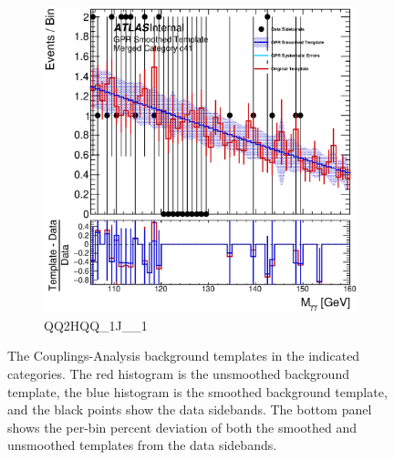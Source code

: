 \begin{figure}
\begin{center}
\begin{subfigure}[T]{0.49\linewidth}
	\includegraphics[width=\linewidth]{figures/background/gpr/coupCatTemplates/GPR_Smoothed_Plot_hmgg_c41.eps}
	\caption{QQ2HQQ\_1J\_\_1}
\end{subfigure}
\caption{The Couplings-Analysis background templates in the indicated categories. The red histogram is the unsmoothed background template, the blue histogram is the smoothed background template, and the black points show the data sidebands. The bottom panel shows the per-bin percent deviation of both the smoothed and unsmoothed templates from the data sidebands. }
 \label{fig:gpr_coupcat_10}
 \end{center}
\end{figure}

